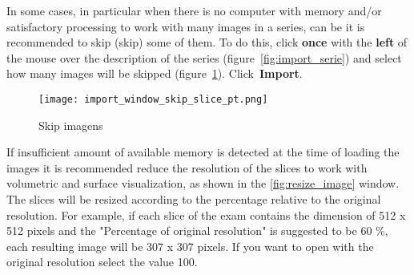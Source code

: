 

In some cases, in particular when there is no computer with memory and/or satisfactory processing to work with many images in a series, can be it is recommended to skip (skip) some of them. To do this, click \textbf {once} with the \textbf{left} of the mouse over the description of the series (figure~\ref{fig:import_serie}) and select how many images will be skipped (figure~\ref{fig:skip_image}). Click~\textbf {Import}.

\begin{figure}[!htb]
\centering
\texttt{[image: import\_window\_skip\_slice\_pt.png]}
\caption{Skip imagens}
\label{fig:skip_image}
\end{figure}



If insufficient amount of available memory is detected at the time of loading the images it is recommended reduce the resolution of the slices to work with volumetric and surface visualization, as shown in the \ref{fig:resize_image} window.
The slices will be resized according to the percentage relative to the original resolution. For example, if each slice of the exam contains the dimension of 512 x 512 pixels and the "Percentage of original resolution" is suggested to be 60 \%, each resulting image will be 307 x 307 pixels. If you want to open with the original resolution select the value 100.

